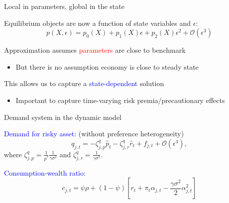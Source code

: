\begin{frame}{Local in parameters, global in the state}

\begin{wideitemize}
	\item Equilibrium objects are now a function of state variables and $\epsilon$:
	\begin{equation}
		    p(X,\epsilon) = p_{0}(X) + p_{1}(X) \epsilon + p_{2}(X) \epsilon^2 + \mathcal{O}(\epsilon^3)\nonumber
	\end{equation} 

	\item Approximation assumes \textcolor{red}{parameters} are close to benchmark
	\begin{itemize}
		\item But there is no assumption economy is close to steady state
	\end{itemize} 
	\vspace{0.3cm}
	\item This allows us to capture a \textcolor{blue}{state-dependent} solution
	\begin{itemize}
		\item Important to capture time-varying risk premia/precautionary effects
	\end{itemize}
\end{wideitemize}

\end{frame}

\begin{frame}{Demand system in the dynamic model}

\textcolor{blue}{Demand for risky asset:} (without preference heterogeneity)
\[
q_{j,t} = - \zeta_{j,p}^q \hat{p}_t - \zeta_{j,r}^q \hat{r}_t + f_{j,t} + \mathcal{O}(\epsilon^3),
\]\small
where $\zeta_{j,p}^q = \frac{1}{p^*} \frac{1}{\gamma \sigma^2}$ and $\zeta^q_{j,r} = \frac{1}{\gamma \sigma^2} $.\normalsize

\vspH  \vspH

\textcolor{blue}{Consumption-wealth ratio:} 
\[
c_{j,t} = \psi \rho + (1-\psi) \left[ r_t + \pi_t \alpha_{j,t} - \frac{\gamma \sigma^2}{2} \alpha_{j,t}^2 \right]
\]
\end{frame}

